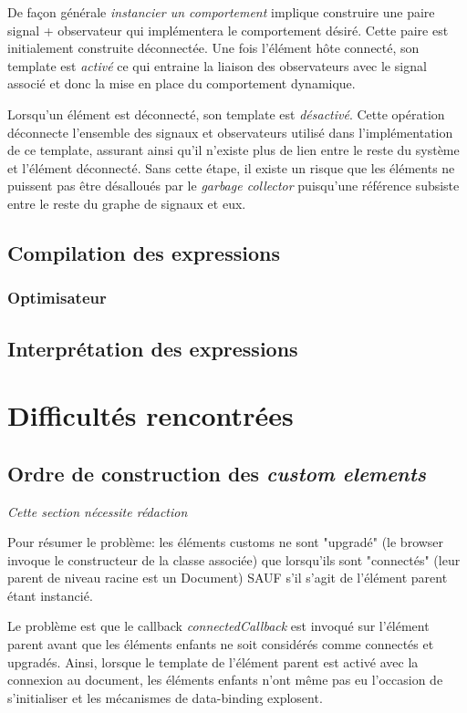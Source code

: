 De façon générale \emph{instancier un comportement} implique construire une paire signal + observateur qui implémentera le comportement désiré. Cette paire est initialement construite déconnectée. Une fois l'élément hôte connecté, son template est \emph{activé} ce qui entraine la liaison  des observateurs avec le signal associé et donc la mise en place du comportement dynamique.

Lorsqu'un élément est déconnecté, son template est \emph{désactivé}. Cette opération déconnecte l'ensemble des signaux et observateurs utilisé dans l'implémentation de ce template, assurant ainsi qu'il n'existe plus de lien entre le reste du système et l'élément déconnecté. Sans cette étape, il existe un risque que les éléments ne puissent pas être désalloués par le \emph{garbage collector} puisqu'une référence subsiste entre le reste du graphe de signaux et eux.

\subsection{Compilation des expressions}
\subsubsection{Optimisateur}
\subsection{Interprétation des expressions}

\newpage
\section{Difficultés rencontrées}
\subsection{Ordre de construction des \emph{custom elements}}

\textit{Cette section nécessite rédaction}

Pour résumer le problème: les éléments customs ne sont "upgradé" (le browser invoque le constructeur de la classe associée) que lorsqu'ils sont "connectés" (leur parent de niveau racine est un Document) SAUF s'il s'agit de l'élément parent étant instancié.

Le problème est que le callback \emph{connectedCallback} est invoqué sur l'élément parent avant que les éléments enfants ne soit considérés comme connectés et upgradés. Ainsi, lorsque le template de l'élément parent est activé avec la connexion au document, les éléments enfants n'ont même pas eu l'occasion de s'initialiser et les mécanismes de data-binding explosent.

